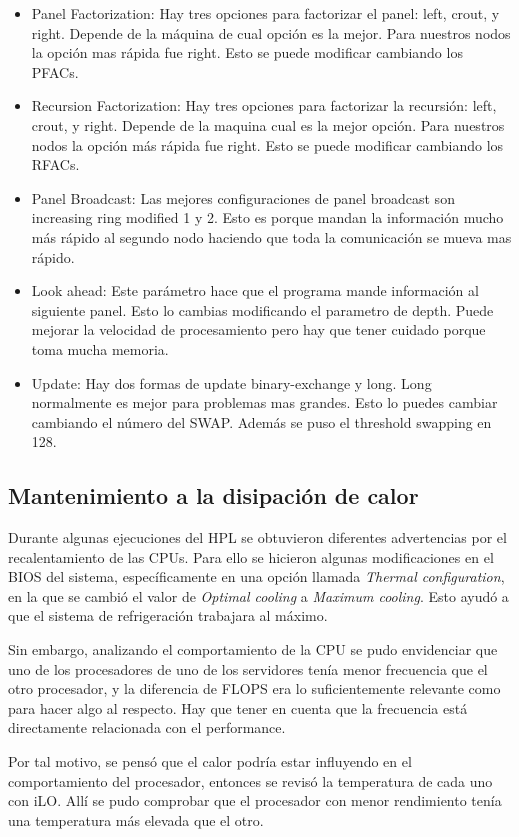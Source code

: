 \documentclass[conference,compsoc]{IEEEtran}
\begin{document}
\begin{itemize}
	\item Panel Factorization: Hay tres opciones para factorizar el panel: left, crout, y right. Depende de la máquina de cual opción es la mejor. Para nuestros nodos la opción mas rápida fue right. Esto se puede modificar cambiando los PFACs.
    \item Recursion Factorization: Hay tres opciones para factorizar la recursión: left, crout, y right. Depende de la maquina cual es la mejor opción. Para nuestros nodos la opción más rápida fue right. Esto se puede modificar cambiando los RFACs.
    \item Panel Broadcast: Las mejores configuraciones de panel broadcast son increasing ring modified 1 y 2. Esto es porque mandan la información mucho más rápido al segundo nodo haciendo que toda la comunicación se mueva mas rápido.
    \item Look ahead: Este parámetro hace que el programa mande información al siguiente panel. Esto lo cambias modificando el parametro de depth. Puede mejorar la velocidad de procesamiento pero hay que tener cuidado porque toma mucha memoria.
    \item Update: Hay dos formas de update binary-exchange y long. Long normalmente es mejor para problemas mas grandes. Esto lo puedes cambiar cambiando el número del SWAP. Además se puso el threshold swapping en 128.
	
\end{itemize}

\subsection{Mantenimiento a la disipación de calor}
Durante algunas ejecuciones del HPL se obtuvieron diferentes advertencias por el recalentamiento de las CPUs. Para ello se hicieron algunas modificaciones en el BIOS del sistema, específicamente en una opción llamada \textit{Thermal configuration}, en la que se cambió el valor de \textit{Optimal cooling} a \textit{Maximum cooling}. Esto ayudó a que el sistema de refrigeración trabajara al máximo.

Sin embargo, analizando el comportamiento de la CPU se pudo envidenciar que uno de los procesadores de uno de los servidores tenía menor frecuencia que el otro procesador, y la diferencia de FLOPS era lo suficientemente relevante como para hacer algo al respecto. Hay que tener en cuenta que la frecuencia está directamente relacionada con el performance.

Por tal motivo, se pensó que el calor podría estar influyendo en el comportamiento del procesador, entonces se revisó la temperatura de cada uno con iLO. Allí se pudo comprobar que el procesador con menor rendimiento tenía una temperatura más elevada que el otro.\\
\end{document}
